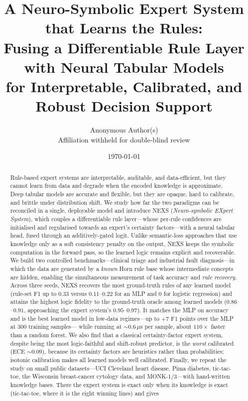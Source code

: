 \documentclass[11pt]{article}
\title{\textbf{A Neuro-Symbolic Expert System that Learns the Rules:\\
Fusing a Differentiable Rule Layer with Neural Tabular Models\\
for Interpretable, Calibrated, and Robust Decision Support}}
\author{
Anonymous Author(s)\\
\small Affiliation withheld for double-blind review
}
\date{\today}
\newcommand{\nexs}{\textsc{NEXS}}
\begin{document}
\maketitle

\begin{abstract}
Rule-based expert systems are interpretable, auditable, and data-efficient, but
they cannot learn from data and degrade when the encoded knowledge is
approximate. Deep tabular models are accurate and flexible, but they are opaque,
hard to calibrate, and brittle under distribution shift. We study how far the two
paradigms can be reconciled in a single, deployable model and introduce
\nexs{} (\emph{Neuro-symbolic EXpert System}), which couples a differentiable
rule layer---whose per-rule confidences are initialised and regularised towards an
expert's certainty factors---with a neural tabular head, fused through an
additively-gated logit. Unlike semantic-loss approaches that use knowledge only
as a soft consistency penalty on the output, \nexs{} keeps the symbolic
computation in the forward pass, so the learned logic remains explicit and
recoverable. We build two controlled benchmarks---clinical triage and industrial
fault diagnosis---in which the data are generated by a \emph{known} Horn rule base
whose intermediate concepts are hidden, enabling the simultaneous measurement of
task accuracy and \emph{rule recovery}. Across three seeds, \nexs{} recovers the
most ground-truth rules of any learned model (rule-set F1 up to $0.33$ versus
$0.11$--$0.22$ for an MLP and $0$ for logistic regression) and attains the highest logic fidelity to the ground-truth oracle
among learned models ($0.86$--$0.91$, approaching the expert system's
$0.95$--$0.97$). It matches the MLP on accuracy and is the best learned model in
low-data regimes---up to $+7$ F1 points over the MLP at $300$ training samples---
while running at ${\sim}0.6\,\mu$s per sample, about $110\times$ faster than a
random forest. We also find that a classical certainty-factor expert system,
despite being the most logic-faithful and shift-robust predictor, is the
\emph{worst} calibrated (ECE ${\sim}0.09$), because its certainty factors are
heuristics rather than probabilities; isotonic calibration makes all learned
models well calibrated. Finally, we repeat the study on small public
datasets---UCI Cleveland heart disease, Pima diabetes, tic-tac-toe, the Wisconsin
breast-cancer cytology data, and MONK-1/3---with hand-written knowledge bases.
There the expert system is exact only when its
knowledge is exact (tic-tac-toe, where it is the eight winning lines) and gives

\end{abstract}
\end{document}
